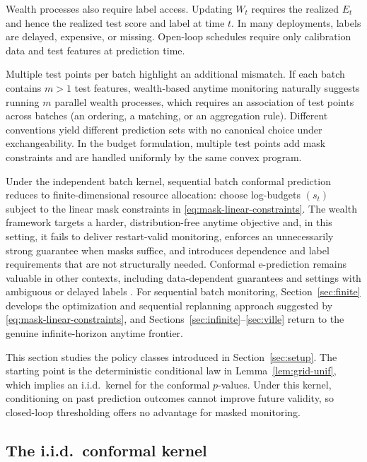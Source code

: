 \documentclass{uai2026} %
\newcommand{\1}{\mathbf{1}}
\begin{document}
Wealth processes also require label access.
Updating $W_t$ requires the realized $E_t$ and hence the realized test score and label at time $t$.
In many deployments, labels are delayed, expensive, or missing.
Open-loop schedules require only calibration data and test features at prediction time.

Multiple test points per batch highlight an additional mismatch.
If each batch contains $m>1$ test features, wealth-based anytime monitoring naturally suggests running $m$ parallel wealth processes, which requires an association of test points across batches (an ordering, a matching, or an aggregation rule).
Different conventions yield different prediction sets with no canonical choice under exchangeability.
In the budget formulation, multiple test points add mask constraints and are handled uniformly by the same convex program.

Under the independent batch kernel, sequential batch conformal prediction reduces to finite-dimensional resource allocation: choose log-budgets $(s_t)$ subject to the linear mask constraints in \eqref{eq:mask-linear-constraints}.
The wealth framework targets a harder, distribution-free anytime objective and, in this setting, it fails to deliver restart-valid monitoring, enforces an unnecessarily strong guarantee when masks suffice, and introduces dependence and label requirements that are not structurally needed.
Conformal e-prediction remains valuable in other contexts, including data-dependent guarantees and settings with ambiguous or delayed labels \citep{gauthier2025values}.
For sequential batch monitoring, Section~\ref{sec:finite} develops the optimization and sequential replanning approach suggested by \eqref{eq:mask-linear-constraints}, and Sections~\ref{sec:infinite}--\ref{sec:ville} return to the genuine infinite-horizon anytime frontier.

\iffalse
This section studies the policy classes introduced in Section~\ref{sec:setup}.
The starting point is the deterministic conditional law in Lemma~\ref{lem:grid-unif}, which implies an i.i.d.\ kernel for the conformal $p$-values.
Under this kernel, conditioning on past prediction outcomes cannot improve future validity, so closed-loop thresholding offers no advantage for masked monitoring.

\subsection{The i.i.d.\ conformal kernel}
\end{document}
